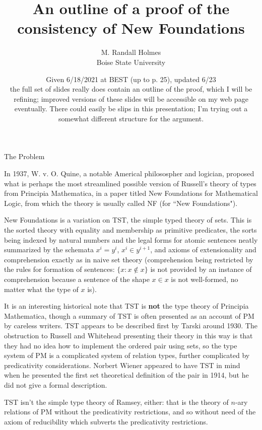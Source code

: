 \documentclass{slides}
\author{M. Randall Holmes\\Boise State University}
\title{An outline of a proof of the consistency of New Foundations}
\date{Given 6/18/2021 at BEST (up to p. 25), updated 6/23\\
the full set of slides really does contain an outline of the proof, which I will be refining;  improved versions of these slides will be accessible on my web page eventually.  There could easily be slips in this presentation;  I'm trying out a somewhat different structure for the argument.}
\begin{document}
\begin{slide}

\maketitle

\end{slide}

\begin{slide}


{\Large The Problem}

In 1937, W. v. O. Quine, a notable Americal philosospher and logician, proposed what is perhaps the most streamlined possible version of Russell's theory of types from Principia Mathematica, in a paper titled New Foundations for Mathematical Logic, from which the theory is usually called NF (for ``New Foundations").



\end{slide}

\begin{slide}

New Foundations is a variation on TST, the simple typed theory of sets.  This is the sorted theory with equality and membership as primitive predicates, the sorts being indexed by natural numbers and the legal forms for atomic sentences neatly summarized by the schemata $x^i = y^i$, $x^i \in y^{i+1}$, and axioms of extensionality and comprehension exactly as in naive set theory (comprehension being restricted by the rules for formation of sentences:  $\{x:x \not\in x\}$ is not provided by an instance of comprehension because a sentence of the shape
$x \in x$ is not well-formed, no matter what the type of $x$ is).

\end{slide}

\begin{slide}

It is an interesting historical note that TST is {\bf not} the type theory of Principia Mathematica, though a summary of TST is often presented as an account of PM by careless writers.  TST appears to be described first by  Tarski around 1930.  The obstruction to Russell and Whitehead presenting their theory in this way is that they had no idea how to implement the ordered pair using sets, so the type system of PM is a complicated system of relation types, further complicated by predicativity considerations.  Norbert Wiener appeared to have TST in mind when he presented the first set theoretical definition of the pair in 1914, but he did not give a formal description.

TST isn't the simple type theory of Ramsey, either:  that is the theory of $n$-ary relations of PM without the predicativity restrictions, and so without need of the axiom of reducibility which subverts the predicativity restrictions.

\end{slide}
\end{document}
